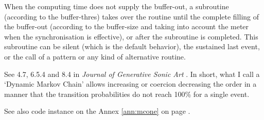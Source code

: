 \bigskip
\bigskip

{}

\bigskip

When the computing time does not supply the buffer-out, a subroutine (according to the buffer-thres) takes over the routine until the complete filling of the buffer-out (according to the buffer-size and  taking into account the meter when the synchronisation is effective), or after the subroutine is completed. This subroutine can be silent (which is the default behavior), the sustained last event, or the call of a pattern or any kind of alternative routine.

\bigskip
\bigskip


\bigskip

See  4.7, 6.5.4 and 8.4 in \textsl{Journal of Generative Sonic Art} \citep{yi}. In short, what I call a `Dynamic Markov Chain' allows increasing or coercion decreasing the order in a manner that the transition probabilities do not reach 100\% for a single event.
 
See also code instance on the Annex \ref{ann:mcone} on page \pageref{ann:mcone}.

%
%

